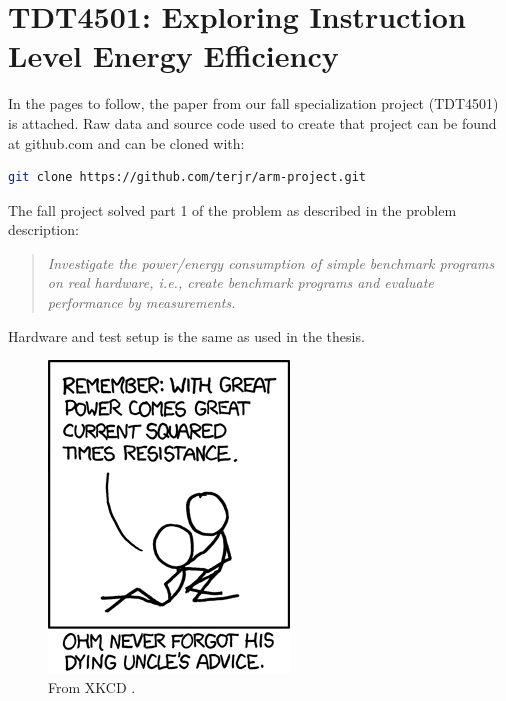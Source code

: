 \documentclass{MScthesisITEM}
\begin{document}
\chapter{TDT4501: Exploring Instruction Level Energy Efficiency}
\label{RH13}
In the pages to follow, the paper from our fall specialization project (TDT4501)
is attached. Raw data and source code used to create that project can be found at github.com
and can be cloned with:
\begin{lstlisting}[language=bash,numbers=none]
git clone https://github.com/terjr/arm-project.git
\end{lstlisting}

\noindent The fall project solved part 1 of the problem as described in the problem description:\hfill\\
\begin{quote}
    \emph{Investigate the power/energy
consumption of simple benchmark programs on real hardware, i.e., create benchmark
programs and evaluate performance by measurements.}
\end{quote}

Hardware and test setup is the same as used in the thesis.

\vfill
\newpage

\thispagestyle{empty}
\hfill
\vfill

\newpage



\newpage
\thispagestyle{empty}
\vfill
\newpage
\thispagestyle{empty}
\centering
\begin{figure}[H]
    \centering
    \includegraphics{figs/ohm.png}
    \caption*{From XKCD \cite{xkcd}.}
\end{figure}
\vfill
\end{document}
